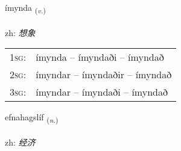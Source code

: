 \documentclass[frontgrid, backgrid]{flacards}\usepackage[]{graphicx}\usepackage[]{color}
\begin{document}
\renewcommand{\flhead}{\vskip5pt \fboxsep=0pt {\small\bfseries\footnotesize Sagnorð | 动词}}
\renewcommand{\fcfoot}{\vskip5pt \fboxsep=0pt \hspace{2pt}{\small\bfseries\footnotesize 2K}}

\renewcommand{\blhead}{\vskip5pt {\small\bfseries\footnotesize Sagnorð | 动词 }}
\renewcommand{\bcfoot}{\vskip5pt \hspace{2pt}{\small\bfseries\footnotesize 2K}}


{ímynda \small{\textsubscript{(\textit{v.})}} \\[1ex] %
\textphonetic{[iːmɪnta]} \\
zh: \emph{想象} \\  [2ex]
\renewcommand*{\arraystretch}{0.8}
\begin{tabular}{p{1cm}l}
\textsc{1sg}: & ímynda -- ímyndaði -- ímyndað \\ 
\textsc{2sg}: & ímyndar -- ímyndaðir -- ímyndað \\ 
\textsc{3sg}: & ímyndar -- ímyndaði -- ímyndað \\ 
\end{tabular}
}

\renewcommand{\flhead}{\vskip5pt \fboxsep=0pt {\small\bfseries\footnotesize Nafnorð | 名词}}
\renewcommand{\fcfoot}{\vskip5pt \fboxsep=0pt \hspace{2pt}{\small\bfseries\footnotesize 2K}}

\renewcommand{\blhead}{\vskip5pt {\small\bfseries\footnotesize Nafnorð | 名词 }}
\renewcommand{\bcfoot}{\vskip5pt \hspace{2pt}{\small\bfseries\footnotesize 2K}}


{efnahagslíf \small{\textsubscript{(\textit{n.})}} \\[1ex] %
\textphonetic{[ɛpnahaxstliv]} \\
zh: \emph{经济} \\  [2ex]
\renewcommand*{\arraystretch}{0.8}
}
\end{document}
